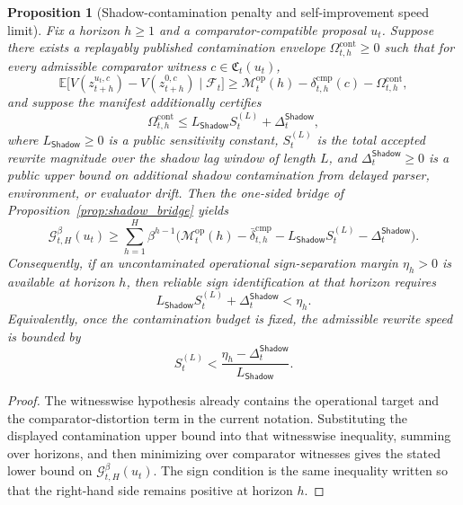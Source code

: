 \documentclass[11pt]{article}
\newtheorem{proposition}[theorem]{Proposition}
\theoremstyle{definition}
\newcommand{\E}{\mathbb{E}}
\newcommand{\1}{\mathbf{1}}
\newcommand{\Shadow}{\mathsf{Shadow}}
\begin{document}
\begin{proposition}[Shadow-contamination penalty and self-improvement speed limit]\label{prop:shadow_speed}
Fix a horizon $h\ge 1$ and a comparator-compatible proposal $u_t$. Suppose there exists a replayably published contamination envelope $\Omega_{t,h}^{\mathrm{cont}}\ge 0$ such that for every admissible comparator witness $c\in\mathfrak C_t(u_t)$,
\[
\E\bigl[V(z_{t+h}^{u_t,c})-V(z_{t+h}^{0,c})\mid\mathcal F_t\bigr]
\ge
\mathcal M_t^{\mathrm{op}}(h)-\delta_{t,h}^{\mathrm{cmp}}(c)-\Omega_{t,h}^{\mathrm{cont}},
\]
and suppose the manifest additionally certifies
\[
\Omega_{t,h}^{\mathrm{cont}}\le L_{\Shadow}S_t^{(L)} + \Delta_t^{\Shadow},
\]
where $L_{\Shadow}\ge 0$ is a public sensitivity constant, $S_t^{(L)}$ is the total accepted rewrite magnitude over the shadow lag window of length $L$, and $\Delta_t^{\Shadow}\ge 0$ is a public upper bound on additional shadow contamination from delayed parser, environment, or evaluator drift. Then the one-sided bridge of Proposition~\ref{prop:shadow_bridge} yields
\[
\mathcal G_{t,H}^{\beta}(u_t)
\ge
\sum_{h=1}^{H}\beta^{h-1}\bigl(\mathcal M_t^{\mathrm{op}}(h)-\bar\delta_{t,h}^{\mathrm{cmp}}-L_{\Shadow}S_t^{(L)}-\Delta_t^{\Shadow}\bigr).
\]
Consequently, if an uncontaminated operational sign-separation margin $\eta_h>0$ is available at horizon $h$, then reliable sign identification at that horizon requires
\[
L_{\Shadow}S_t^{(L)} + \Delta_t^{\Shadow} < \eta_h.
\]
Equivalently, once the contamination budget is fixed, the admissible rewrite speed is bounded by
\[
S_t^{(L)} < \frac{\eta_h-\Delta_t^{\Shadow}}{L_{\Shadow}}.
\]
\end{proposition}

\begin{proof}
The witnesswise hypothesis already contains the operational target and the comparator-distortion term in the current notation. Substituting the displayed contamination upper bound into that witnesswise inequality, summing over horizons, and then minimizing over comparator witnesses gives the stated lower bound on $\mathcal G_{t,H}^{\beta}(u_t)$. The sign condition is the same inequality written so that the right-hand side remains positive at horizon $h$.
\end{proof}
\end{document}
